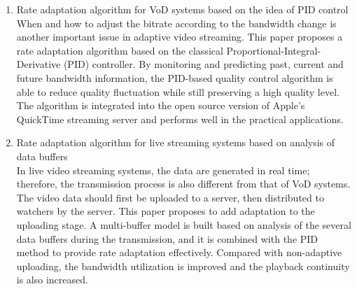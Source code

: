 \begin{eabstract}
\begin{enumerate}
\item {Rate adaptation algorithm for VoD systems based on the idea of PID control}\\
When and how to adjust the bitrate according to the bandwidth change is another important issue in adaptive video streaming. This paper proposes a rate adaptation algorithm based on the classical Proportional-Integral-Derivative (PID) controller. By monitoring and predicting past, current and future bandwidth information, the PID-based quality control algorithm is able to reduce quality fluctuation while still preserving a high quality level. The algorithm is integrated into the open source version of Apple's QuickTime streaming server and performs well in the practical applications.
\item {Rate adaptation algorithm for live streaming systems based on analysis of data buffers}\\
In live video streaming systems, the data are generated in real time; therefore, the transmission process is also different from that of VoD systems. The video data should first be uploaded to a server, then distributed to watchers by the server. This paper proposes to add adaptation to the uploading stage. A multi-buffer model is built based on analysis of the several data buffers during the transmission, and it is combined with the PID method to provide rate adaptation effectively. Compared with non-adaptive uploading, the bandwidth utilization is improved and the playback continuity is also increased.
\end{enumerate}
\end{eabstract}